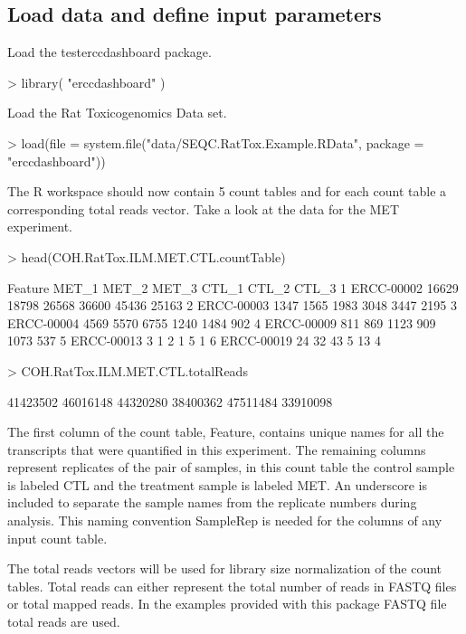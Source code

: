 \documentclass{article}
\begin{document}
\subsection{Load data and define input parameters}
Load the testerccdashboard package. 
\begin{Schunk}
\begin{Sinput}
> library( "erccdashboard" )
\end{Sinput}
\end{Schunk}
Load the Rat Toxicogenomics Data set.
\begin{Schunk}
\begin{Sinput}
> load(file = system.file("data/SEQC.RatTox.Example.RData", 
                          package = "erccdashboard"))
\end{Sinput}
\end{Schunk}
The R workspace should now contain 5 count tables and for each count table a 
corresponding total reads vector.
Take a look at the data for the MET experiment.
\begin{Schunk}
\begin{Sinput}
> head(COH.RatTox.ILM.MET.CTL.countTable)
\end{Sinput}
\begin{Soutput}
     Feature MET_1 MET_2 MET_3 CTL_1 CTL_2 CTL_3
1 ERCC-00002 16629 18798 26568 36600 45436 25163
2 ERCC-00003  1347  1565  1983  3048  3447  2195
3 ERCC-00004  4569  5570  6755  1240  1484   902
4 ERCC-00009   811   869  1123   909  1073   537
5 ERCC-00013     3     1     2     1     5     1
6 ERCC-00019    24    32    43     5    13     4
\end{Soutput}
\begin{Sinput}
> COH.RatTox.ILM.MET.CTL.totalReads
\end{Sinput}
\begin{Soutput}
[1] 41423502 46016148 44320280 38400362 47511484 33910098
\end{Soutput}
\end{Schunk}
The first column of the count table, Feature, contains unique names for all
the transcripts that were quantified in this experiment. The remaining columns 
represent replicates of the pair of samples, in this count table 
the control sample is labeled CTL and the treatment sample is labeled MET. An 
underscore is included to separate the sample names from the replicate numbers 
during analysis. This naming convention Sample\textunderscore{}Rep is needed 
for the columns of any input count table.

The total reads vectors will be used for library size normalization of the count
tables. Total reads can either represent the total number of reads in FASTQ 
files or total mapped reads. In the examples provided with this package FASTQ 
file total reads are used.
\end{document}
